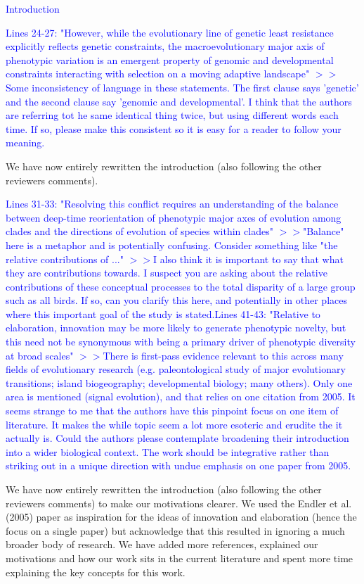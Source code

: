 \documentclass[12pt,letterpaper]{article}
\begin{document}
{\textcolor{blue}{Introduction}

\textcolor{blue}{Lines 24-27: "However, while the evolutionary line of genetic least resistance explicitly reflects genetic constraints, the macroevolutionary major axis of phenotypic variation is an emergent property of genomic and developmental constraints interacting with selection on a moving adaptive landscape"
$>>$Some inconsistency of language in these statements. The first clause says 'genetic' and the second clause say 'genomic and developmental'. I think that the authors are referring tot he same identical thing twice, but using different words each time. If so, please make this consistent so it is easy for a reader to follow your meaning.}

We have now entirely rewritten the introduction (also following the other reviewers comments). 

\textcolor{blue}{Lines 31-33: "Resolving this conflict requires an understanding of the balance between deep-time reorientation of phenotypic major axes of evolution among clades and the directions of evolution of species within clades"
$>>$"Balance" here is a metaphor and is potentially confusing. Consider something like "the relative contributions of ..."
$>>$I also think it is important to say that what they are contributions towards. I suspect you are asking about the relative contributions of these conceptual processes to the total disparity of a large group such as all birds. If so, can you clarify this here, and potentially in other places where this important goal of the study is stated.Lines 41-43: "Relative to elaboration, innovation may be more likely to generate phenotypic novelty, but this need not be synonymous with being a primary driver of phenotypic diversity at broad scales"
$>>$There is first-pass evidence relevant to this across many fields of evolutionary research (e.g. paleontological study of major evolutionary transitions; island biogeography; developmental biology; many others). Only one area is mentioned (signal evolution), and that relies on one citation from 2005. It seems strange to me that the authors have this pinpoint focus on one item of literature. It makes the while topic seem a lot more esoteric and erudite the it actually is. Could the authors please contemplate broadening their introduction into a wider biological context. The work should be integrative rather than striking out in a unique direction with undue emphasis on one paper from 2005.}

We have now entirely rewritten the introduction (also following the other reviewers comments) to make our motivations clearer. We used the Endler et al. (2005) paper as inspiration for the ideas of innovation and elaboration (hence the focus on a single paper) but acknowledge that this resulted in ignoring a much broader body of research. We have added more references, explained our motivations and how our work sits in the current literature and spent more time explaining the key concepts for this work.

}
\end{document}
